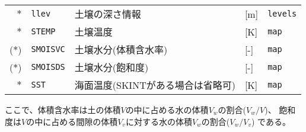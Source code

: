 {\begin{table}[hbt]
\begin{center}
\begin{tabularx}{150mm}{rl|l|l|X}
$\ast$ &\verb|llev|    & 土壌の深さ情報  & [m]      & \verb|levels| \\
$\ast$ &\verb|STEMP|   & 土壌温度        & [K]      & \verb|map| \\
($\ast$) &\verb|SMOISVC| & 土壌水分(体積含水率)     & [-] & \verb|map| \\
($\ast$) &\verb|SMOISDS| & 土壌水分(飽和度)         & [-] & \verb|map| \\
$\ast$ &\verb|SST|     & 海面温度(SKINTがある場合は省略可) & [K] & \verb|map|\\
\end{tabularx}
\label{tab:grdvar_item}
\end{center}
\end{table}
}

ここで、体積含水率は土の体積$V$の中に占める水の体積$V_w$の割合($V_w / V$)、
飽和度は$V$の中に占める間隙の体積$V_v$に対する水の体積$V_w$の割合($V_w / V_v$)
である。

~\\
\\
~\\
